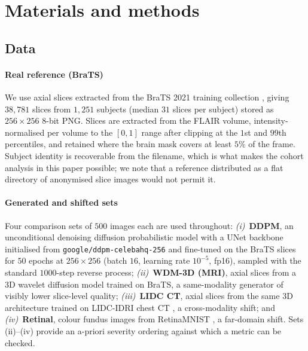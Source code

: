\documentclass[preprint,12pt,authoryear]{elsarticle}
\begin{document}
\section{Materials and methods}
\label{sec:methods}

\subsection{Data}
\label{sec:data}

\paragraph{Real reference (BraTS)}
We use axial slices extracted from the BraTS 2021 training collection
\citep{baid2021rsna}, giving $38{,}781$ slices from $1{,}251$ subjects
(median $31$ slices per subject) stored as $256\times256$ 8-bit PNG. Slices are
extracted from the FLAIR volume, intensity-normalised per volume to the
$[0,1]$ range after clipping at the $1$st and $99$th percentiles, and retained
where the brain mask covers at least $5\%$ of the frame. Subject identity is
recoverable from the filename, which is what makes the cohort analysis in this
paper possible; we note that a reference distributed as a flat directory of
anonymised slice images would not permit it.

\paragraph{Generated and shifted sets}
Four comparison sets of $500$ images each are used throughout:
\emph{(i)}~\textbf{DDPM}, an unconditional denoising diffusion probabilistic
model \citep{ho2020denoising} with a UNet backbone initialised from
\texttt{google/ddpm-celebahq-256} and fine-tuned on the BraTS slices for $50$
epochs at $256\times256$ (batch $16$, learning rate $10^{-5}$, fp16), sampled
with the standard $1000$-step reverse process;
\emph{(ii)}~\textbf{WDM-3D (MRI)}, axial slices from a 3D wavelet diffusion
model \citep{friedrich2024wdm} trained on BraTS, a same-modality generator of
visibly lower slice-level quality;
\emph{(iii)}~\textbf{LIDC CT}, axial slices from the same 3D architecture
trained on LIDC-IDRI chest CT \citep{armato2011lidc}, a cross-modality shift;
and \emph{(iv)}~\textbf{Retinal}, colour fundus images from RetinaMNIST
\citep{yang2023medmnist}, a far-domain shift. Sets (ii)--(iv) provide an
a-priori severity ordering against which a metric can be checked.
\end{document}
